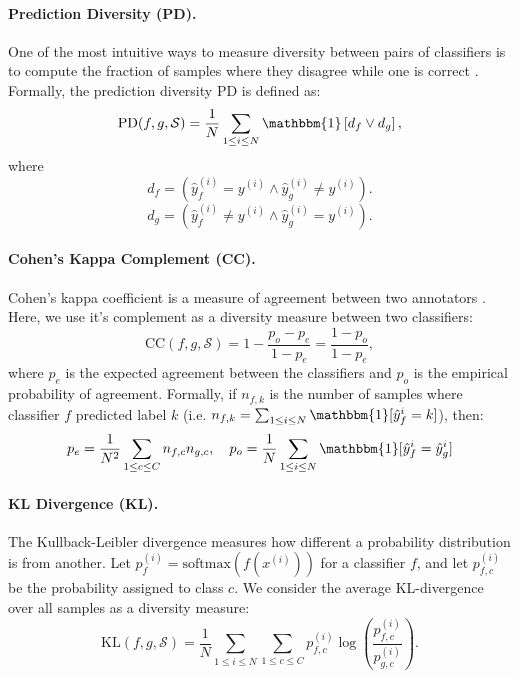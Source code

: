 \paragraph{Prediction Diversity (PD).} One of the most intuitive ways to measure diversity between pairs of classifiers is to compute the fraction of samples where they disagree while one is correct \cite{ho1998random,skalak1996sources}. Formally, the prediction diversity $\textrm{PD}$ is defined as:
\begin{equation}
    \textrm{PD}(f, g, \mathcal{S}) = \frac{1}{N}\sum_{1 \le i \le N} \mathbbm{1}\left[d_f \vee d_g \right],
    \label{eq:pd}
\end{equation}
where
\begin{equation}
    d_{f} = \left(\hat{y}_f^{(i)} = y^{(i)} \wedge \hat{y}_g^{(i)} \ne y^{(i)}\right).
\end{equation}
\begin{equation}
    d_{g} = \left(\hat{y}_f^{(i)} \ne y^{(i)} \wedge \hat{y}_g^{(i)} = y^{(i)}\right).
\end{equation}


\paragraph{Cohen's Kappa Complement (CC).} Cohen's kappa coefficient is a measure of agreement between two annotators \cite{mchugh2012interrater}. Here, we use it's complement as a diversity measure between two classifiers:
\begin{equation}
    \textrm{CC}(f, g, \mathcal{S}) = 1 - \frac{p_o - p_e}{1 - p_e}  = \frac{1-p_o}{1-p_e},
    \label{eq:cc}
\end{equation}
where $p_e$ is the expected agreement between the classifiers and $p_o$ is the empirical probability of agreement. Formally, if $n_{f,k}$ is the number of samples where classifier $f$ predicted label $k$ (i.e. $n_{f,k} = \sum_{1\le i \le N} \mathbbm{1}[\hat{y}^{i}_f = k]$), then:
\begin{equation}
    p_e = \frac{1}{N^2}\sum_{1\le c \le C}n_{f,c}n_{g,c}, \quad p_o = \frac{1}{N}\sum_{1\le i \le N}\mathbbm{1}[\hat{y}^{i}_f = \hat{y}^{i}_g]
\end{equation}

\paragraph{KL Divergence (KL).} The Kullback-Leibler divergence measures how different a probability distribution is from another. Let $p_f^{(i)} = \textrm{softmax}\left(f(x^{(i)})\right)$ for a classifier $f$, and let $p_{f,c}^{(i)}$ be the probability assigned to class $c$. We consider the average KL-divergence over all samples as a diversity measure:
\begin{equation}
    \textrm{KL}(f, g, \mathcal{S}) = \frac{1}{N}\sum_{1 \le i \le N}\sum_{1\le c \le C}p_{f,c}^{(i)}\log\left(\frac{p_{f,c}^{(i)}}{p_{g,c}^{(i)}}\right).
    \label{eq:kl}
\end{equation}


